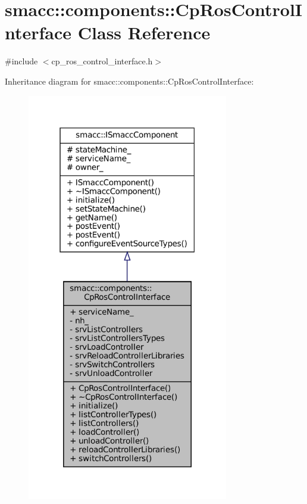 \hypertarget{classsmacc_1_1components_1_1CpRosControlInterface}{}\section{smacc\+:\+:components\+:\+:Cp\+Ros\+Control\+Interface Class Reference}
\label{classsmacc_1_1components_1_1CpRosControlInterface}


{\ttfamily \#include $<$cp\+\_\+ros\+\_\+control\+\_\+interface.\+h$>$}



Inheritance diagram for smacc\+:\+:components\+:\+:Cp\+Ros\+Control\+Interface\+:
\nopagebreak
\begin{figure}[H]
\begin{center}
\leavevmode
\includegraphics[width=249pt]{classsmacc_1_1components_1_1CpRosControlInterface__inherit__graph}
\end{center}
\end{figure}


